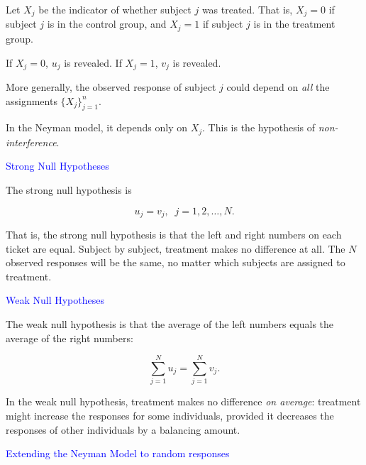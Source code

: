 \documentclass[landscape]{slides}
\newcommand{\beq}{\begin{equation}}
\newcommand{\eeq}{\end{equation}}
\begin{document}
\begin{slide}
\begin{slide}
   Let $X_j$ be the indicator of whether subject $j$ was treated.
    That is, $X_j = 0$ if subject $j$ is in the control group, and 
    $X_j = 1$ if subject $j$ is in the treatment group.
    
    If $X_j = 0$, $u_j$ is revealed.  If $X_j = 1$, $v_j$ is revealed.
    
    More generally, the observed response of subject $j$ could depend on {\em all\/} the 
    assignments $\{X_j\}_{j=1}^n$.
    
    In the Neyman model, it depends only on $X_j$.  
    This is the hypothesis of {\em non-interference\/}.


\end{slide}

\begin{slide}
{\textcolor{blue}{Strong Null Hypotheses}}

    The strong null hypothesis is

\beq
     u_j  = v_j, \;\; j = 1, 2, \ldots, N.
 \eeq
   
   That is, the strong null hypothesis is that the left and right numbers on each ticket
    are equal.
    Subject by subject, treatment makes no difference at all.
    The $N$ observed responses will be the same, no matter which subjects are assigned
    to treatment.

\end{slide}

\begin{slide}
{\textcolor{blue}{Weak Null Hypotheses}}

    The weak null hypothesis is that the average of the left numbers equals the average
    of the right numbers:

\beq
    \sum_{j=1}^N u_j = \sum_{j=1}^N v_j.
\eeq

   In the weak null hypothesis, treatment makes no difference {\em on average\/}:
   treatment might increase the responses for some individuals, provided it decreases
  the responses of other individuals by a balancing amount.

\end{slide}

\begin{slide}
{\textcolor{blue}{Extending the Neyman Model to random responses}}


\end{slide}
\end{slide}
\end{document}
